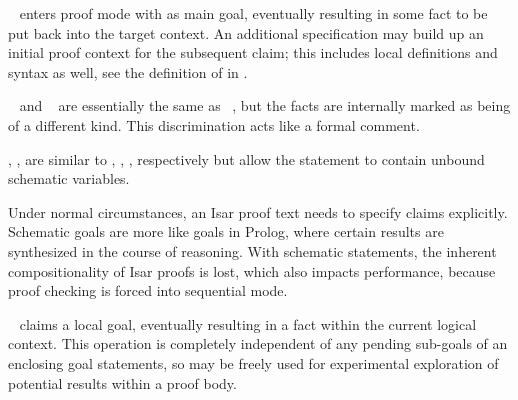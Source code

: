 \begin{isabellebody}
\begin{isamarkuptext}
  \begin{description}
  
  \item \hyperlink{command.lemma}{\mbox{}}~ enters proof mode with
  \isa{{\isasymphi}} as main goal, eventually resulting in some fact \isa{{\isachardoublequote}{\isasymturnstile}\ {\isasymphi}{\isachardoublequote}} to be put back into the target context.  An additional
   specification may build up an initial proof
  context for the subsequent claim; this includes local definitions
  and syntax as well, see the definition of \hyperlink{syntax.contextelem}{\mbox{}} in
  .
  
  \item \hyperlink{command.theorem}{\mbox{}}~ and \hyperlink{command.corollary}{\mbox{}}~ are essentially the same as \hyperlink{command.lemma}{\mbox{}}~, but the facts are internally marked as
  being of a different kind.  This discrimination acts like a formal
  comment.

  \item \hyperlink{command.schematic-lemma}{\mbox{}}, \hyperlink{command.schematic-theorem}{\mbox{}},
  \hyperlink{command.schematic-corollary}{\mbox{}} are similar to \hyperlink{command.lemma}{\mbox{}},
  \hyperlink{command.theorem}{\mbox{}}, \hyperlink{command.corollary}{\mbox{}}, respectively but allow
  the statement to contain unbound schematic variables.

  Under normal circumstances, an Isar proof text needs to specify
  claims explicitly.  Schematic goals are more like goals in Prolog,
  where certain results are synthesized in the course of reasoning.
  With schematic statements, the inherent compositionality of Isar
  proofs is lost, which also impacts performance, because proof
  checking is forced into sequential mode.
  
  \item \hyperlink{command.have}{\mbox{}}~ claims a local goal,
  eventually resulting in a fact within the current logical context.
  This operation is completely independent of any pending sub-goals of
  an enclosing goal statements, so \hyperlink{command.have}{\mbox{}} may be freely
  used for experimental exploration of potential results within a
  proof body.
  

\end{description}
\end{isamarkuptext}
\end{isabellebody}
